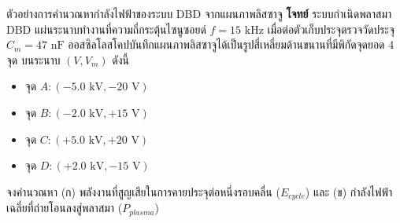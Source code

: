 \begin{examplebox}{ตัวอย่างการคำนวณหากำลังไฟฟ้าของระบบ DBD จากแผนภาพลิสซาจู}
\textbf{โจทย์} ระบบกำเนิดพลาสมา DBD แผ่นระนาบทำงานที่ความถี่กระตุ้นไซนูซอยด์ $f = 15\text{ kHz}$ เมื่อต่อตัวเก็บประจุตรวจวัดประจุ $C_m = 47\text{ nF}$ ออสซิลโลสโคปบันทึกแผนภาพลิสซาจูได้เป็นรูปสี่เหลี่ยมด้านขนานที่มีพิกัดจุดยอด 4 จุด บนระนาบ $(V, V_m)$ ดังนี้
\begin{itemize}
    \item จุด $A: (-5.0\text{ kV}, -20\text{ V})$
    \item จุด $B: (-2.0\text{ kV}, +15\text{ V})$
    \item จุด $C: (+5.0\text{ kV}, +20\text{ V})$
    \item จุด $D: (+2.0\text{ kV}, -15\text{ V})$
\end{itemize}
จงคำนวณหา (ก) พลังงานที่สูญเสียในการคายประจุต่อหนึ่งรอบคลื่น ($E_{cycle}$) และ (ข) กำลังไฟฟ้าเฉลี่ยที่ถ่ายโอนลงสู่พลาสมา ($P_{plasma}$)


\end{examplebox}
